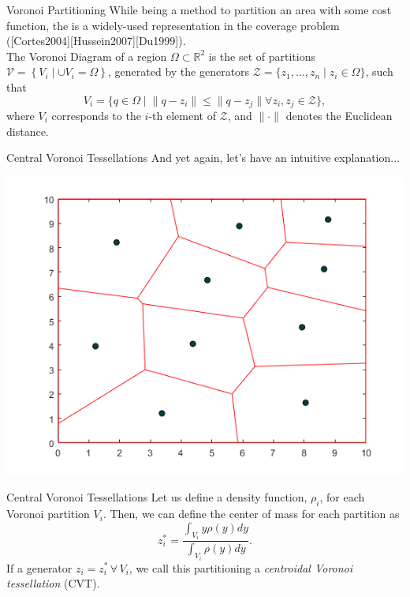 \documentclass[t]{beamer}
\newcommand{\rsqr}{\mathbb{R}^2}
\begin{document}
\begin{frame}[label=vorpart2]{Voronoi Partitioning}
While being a method to partition an area with some cost function, the is a widely-used representation in the coverage problem ([Cortes2004][Hussein2007][Du1999]).
\\
The Voronoi Diagram of a region $\Omega \subset \rsqr$ is the set of partitions $\mathcal{V} = \left\{V_{i} \mid \cup V_{i} = \Omega\right\}$, generated by the generators $\mathcal{Z} = \{z_1,\ldots,z_n\mid z_{i} \in \Omega\}$, such that
\begin{equation} \label{Voronoi Definition}
V_{i} = \{q\in\Omega \mid \lVert q - z_i \rVert \leq \lVert q - z_j \rVert \forall z_i,z_j\in\mathcal{Z}\},
\end{equation}
where $V_{i}$ corresponds to the $i$-th element of $\mathcal{Z}$, and $\lVert \cdot \rVert$ denotes the Euclidean distance.
\end{frame}

\begin{frame}[label=centvorpart1]{Central Voronoi Tessellations}
And yet again, let's have an intuitive explanation...
\begin{center}
\includegraphics[scale=0.5]{central-Voronoi-example.png}
\end{center}
\end{frame}

\begin{frame}[label=centvorpart2]{Central Voronoi Tessellations}
Let us define a density function, $\rho_i$, for each Voronoi partition $V_{i}$. Then, we can define the center of mass for each partition as
\begin{equation}
z_{i}^{*} = \frac{\int_{V_{i}}y\rho(y)dy}{\int_{V_{i}}\rho(y)dy}.
\end{equation}
If a generator $z_{i} = z_{i}^{*} \, \forall \,V_{i}$, we call this partitioning a \emph{centroidal Voronoi tessellation} (CVT).
\end{frame}
\end{document}
